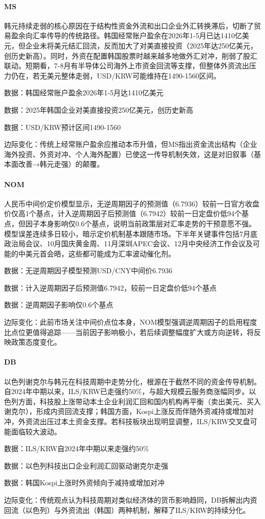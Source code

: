 \documentclass[11pt]{ctexart}
\begin{document}
\paragraph{MS} 韩元持续走弱的核心原因在于结构性资金外流和出口企业外汇转换滞后，切断了贸易盈余向汇率传导的传统路径。韩国经常账户盈余在2026年1-5月已达1410亿美元，但企业未将美元结汇回流，反而加大了对美直接投资（2025年达250亿美元，创历史新高）。同时，外资在配置韩国股票时越来越多地做外汇对冲，削弱了股汇联动。短期看，7-8月有半导体公司海外上市资金回流等支撑，但整体外资流出压力仍在，若无美元整体走弱，USD/KRW可能维持在1490-1560区间。
{\small\color{refgray}数据：韩国经常账户盈余2026年1-5月达1410亿美元\par}
{\small\color{refgray}数据：2025年韩国企业对美直接投资250亿美元，创历史新高\par}
{\small\color{refgray}数据：USD/KRW预计区间1490-1560\par}
{\small\color{refgray}边际变化：传统上经常账户盈余应推动本币升值，但MS指出资金流出结构（企业海外投资、外资对冲、个人海外配置）已使这一传导机制失效，这是对旧叙事（基本面改善→韩元走强）的颠覆。\par}
\paragraph{NOM} 人民币中间价定价模型显示，无逆周期因子的预测值（6.7936）较前一日官方收盘价仅高1个基点，计入逆周期因子后预测值（6.7942）较前一日定盘价低94个基点，但因子本身影响仅0.6个基点，说明当前政策层对汇率走势的干预意愿不强。模型误差连续多日较小，暗示定价机制基本跟随市场。下半年关键事件包括7月底政治局会议、10月国庆黄金周、11月深圳APEC会议、12月中央经济工作会议及可能的中美元首会晤，这些都可能成为汇率波动催化剂。
{\small\color{refgray}数据：无逆周期因子模型预测USD/CNY中间价6.7936\par}
{\small\color{refgray}数据：计入逆周期因子后预测值6.7942，较前一日定盘价低94个基点\par}
{\small\color{refgray}数据：逆周期因子影响仅0.6个基点\par}
{\small\color{refgray}边际变化：此前市场关注中间价点位本身，NOM模型强调逆周期因子的启用程度比点位更值得追踪——当前因子影响极小，若后续调整幅度扩大或方向逆转，将反映政策态度变化。\par}
\paragraph{DB} 以色列谢克尔与韩元在科技周期中走势分化，根源在于截然不同的资金传导机制。自2024年中期以来，ILS/KRW已走强约50\%，与超大规模云服务商涨幅同步。以色列方面，科技股上涨带动本土企业利润汇回和国内机构再平衡（卖出美元、买入谢克尔），形成内资回流支撑；韩国方面，Kospi上涨反而伴随外资减持或增加对冲，外资流出压过本土资金支撑。若科技板块出现明显调整，ILS/KRW交叉盘可能面临较大波动。
{\small\color{refgray}数据：ILS/KRW自2024年中期以来走强约50\%\par}
{\small\color{refgray}数据：以色列科技出口企业利润汇回驱动谢克尔走强\par}
{\small\color{refgray}数据：韩国Kospi上涨时外资倾向于减持或增加对冲\par}
{\small\color{refgray}边际变化：传统观点认为科技周期对类似经济体的货币影响趋同，DB拆解出内资回流（以色列）与外资流出（韩国）两种机制，解释了ILS/KRW的持续分化。\par}
\end{document}

